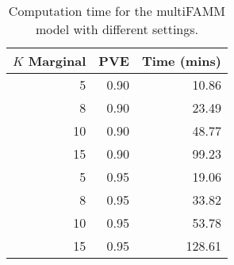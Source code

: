 \begin{table}[ht]
\centering
\begin{tabular}{rrr}
  \toprule
{\bfseries $K$ Marginal} & {\bfseries PVE} & {\bfseries Time (mins)} \\ 
  \midrule
5 & 0.90 & 10.86 \\ 
  8 & 0.90 & 23.49 \\ 
  10 & 0.90 & 48.77 \\ 
  15 & 0.90 & 99.23 \\ 
  5 & 0.95 & 19.06 \\ 
  8 & 0.95 & 33.82 \\ 
  10 & 0.95 & 53.78 \\ 
  15 & 0.95 & 128.61 \\ 
   \bottomrule
\end{tabular}
\caption{Computation time for the multiFAMM model with different settings.} 
\label{tab:mfamm-comp-time}
\end{table}
